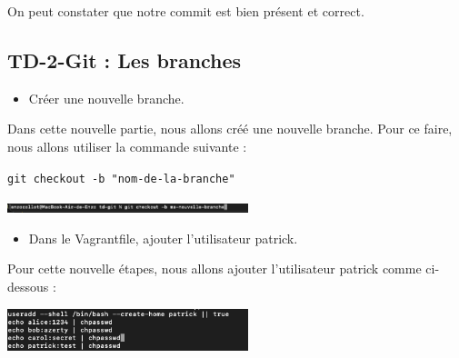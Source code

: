 \documentclass[12pt]{article}
\begin{document}
\vspace{0.3cm}

On peut constater que notre commit est bien présent et correct.

\newpage

\subsection{TD-2-Git : Les branches}

\vspace{0.3cm}

\begin{itemize}
  \item Créer une nouvelle branche.
\end{itemize}

\vspace{0.3cm}

Dans cette nouvelle partie, nous allons créé une nouvelle branche. Pour ce faire, nous allons utiliser la commande suivante : 

\texttt{git checkout -b "nom-de-la-branche"}

\vspace{0.3cm}

\begin{center}
  \includegraphics[width=7cm]{Image-TD-Git-2/git-checkout.png}
\end{center}

\vspace{0.3cm}

\begin{itemize}
  \item Dans le Vagrantfile, ajouter l'utilisateur patrick.
\end{itemize}

\vspace{0.3cm}

Pour cette nouvelle étapes, nous allons ajouter l'utilisateur patrick comme ci-dessous : 

\vspace{0.3cm}

\begin{center}
  \includegraphics[width=7cm]{Image-TD-Git-2/ajout-patrick-vagrant.png}
\end{center}
\end{document}
